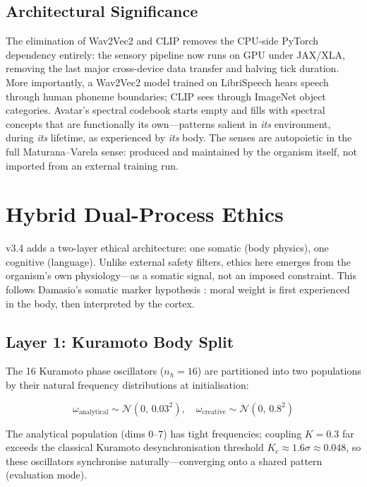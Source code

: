 \documentclass[11pt,a4paper,twocolumn]{article}
\begin{document}
\subsection{Architectural Significance}

The elimination of Wav2Vec2 and CLIP removes the CPU-side PyTorch dependency entirely:
the sensory pipeline now runs on GPU under JAX/XLA, removing the last major cross-device
data transfer and halving tick duration. More importantly, a Wav2Vec2 model trained on
LibriSpeech hears speech through human phoneme boundaries; CLIP sees through ImageNet
object categories. Avatar's spectral codebook starts empty and fills with spectral
concepts that are functionally its own---patterns salient in \emph{its} environment, during
\emph{its} lifetime, as experienced by \emph{its} body. The senses are autopoietic in the
full Maturana--Varela sense: produced and maintained by the organism itself, not imported
from an external training run.

\section{Hybrid Dual-Process Ethics}
\label{sec:dualprocess}

v3.4 adds a two-layer ethical architecture: one somatic (body physics), one cognitive (language).
Unlike external safety filters, ethics here emerges from the organism's own physiology---as a
somatic signal, not an imposed constraint. This follows Damasio's somatic marker hypothesis
\citep{damasio1999}: moral weight is first experienced in the body, then interpreted by the cortex.

\subsection{Layer 1: Kuramoto Body Split}

The 16 Kuramoto phase oscillators ($n_h = 16$) are partitioned into two populations by their
natural frequency distributions at initialisation:

\begin{equation}
\omega_{\text{analytical}} \sim \mathcal{N}(0,\, 0.03^2), \quad
\omega_{\text{creative}} \sim \mathcal{N}(0,\, 0.8^2)
\end{equation}

The analytical population (dims $0$--$7$) has tight frequencies; coupling $K = 0.3$ far exceeds
the classical Kuramoto desynchronisation threshold $K_c \approx 1.6\sigma \approx 0.048$, so these
oscillators synchronise naturally---converging onto a shared pattern (evaluation mode).
\end{document}
